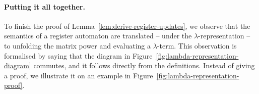 \label{page:monotone-discussed}


\paragraph*{Putting it all together.} To finish the proof of Lemma~\ref{lem:derive-register-updates}, we   observe  that the semantics of a register automaton are translated -- under the $\lambda$-representation -- to unfolding the matrix power and evaluating a $\lambda$-term.  This observation is formalised by saying that the diagram in Figure~\ref{fig:lambda-representation-diagram} commutes, and it  follows directly from the definitions. Instead of giving a proof, we illustrate it on an example in Figure~\ref{fig:lambda-representation-proof}.



